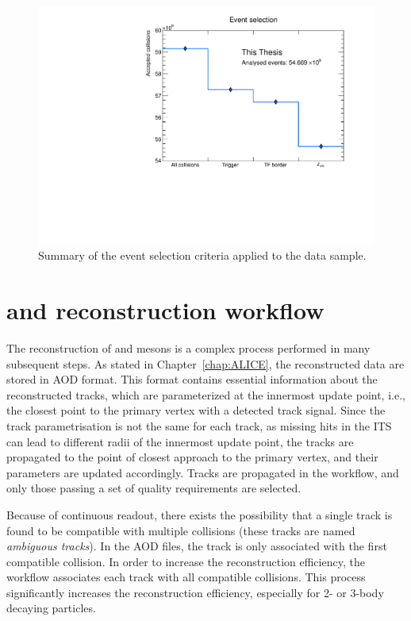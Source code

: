 \begin{figure}[htb]
    \centering
    \includegraphics[width=0.7\linewidth]{Figures/Chapter 4/EventSelection.pdf}
    \caption{Summary of the event selection criteria applied to the data sample.}
    \label{fig:EvSel}
\end{figure}

\section{\texorpdfstring{\ds and \dpl reconstruction workflow}{Ds+ and D+ reconstruction workflow}}
The reconstruction of \ds and \dpl mesons is a complex process performed in many subsequent steps. As stated in Chapter~\ref{chap:ALICE}, the reconstructed data are stored in AOD format. This format contains essential information about the reconstructed tracks, which are parameterized at the innermost update point, i.e., the closest point to the primary vertex with a detected track signal. Since the track parametrisation is not the same for each track, as missing hits in the ITS can lead to different radii of the innermost update point, the tracks are propagated to the point of closest approach to the primary vertex, and their parameters are updated accordingly. Tracks are propagated in the  workflow, and only those passing a set of quality requirements are selected. 

Because of continuous readout, there exists the possibility that a single track is found to be compatible with multiple collisions (these tracks are named \emph{ambiguous tracks}). In the AOD files, the track is only associated with the first compatible collision. In order to increase the reconstruction efficiency, the  workflow associates each track with all compatible collisions. This process significantly increases the reconstruction efficiency, especially for 2- or 3-body decaying particles.

